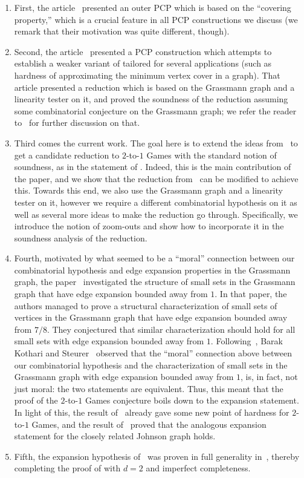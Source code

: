\documentclass{toc}
\begin{document}
\begin{enumerate}
\item First, the %
article~\cite{KS}  %
presented an outer PCP which is based on the ``covering property,'' which is a crucial feature in all PCP constructions we discuss (we remark that their motivation was quite different, though).
\item Second, the %
article~\cite{KMS}
presented a PCP
construction which attempts to establish a weaker variant of  tailored for several applications
(such as hardness of approximating the minimum vertex cover in a graph). That
%
article  %
presented a reduction which is based on the
Grassmann graph and a linearity tester on it, and proved the soundness of the reduction assuming some combinatorial conjecture on the Grassmann graph; we refer the reader to~\cite{KMS} for further discussion on that.
  \item Third comes the current work. The goal here is to extend the ideas from~\cite{KMS} to get a candidate reduction to $2$-to-$1$ Games
  with the standard notion of soundness, as in the statement of . Indeed, this is the main contribution of the
  paper, and we show that the reduction from~\cite{KMS} can be modified to achieve this. Towards this end, we also use the Grassmann graph
  and a linearity tester on it, however we require a different combinatorial hypothesis on it as well as several more ideas to make the
  reduction go through. Specifically, we introduce the notion of zoom-outs and show how to incorporate it in the soundness analysis of
  the reduction.
  \item Fourth, motivated by what seemed to be a ``moral'' connection between our combinatorial hypothesis and edge expansion properties in
  the Grassmann graph, the %
paper~\cite{DKKMS1}
investigated the structure of small sets in the Grassmann graph that have edge expansion
bounded away from $1$. In that %
paper, %
the authors managed to prove a structural characterization of small sets of vertices in the
  Grassmann graph that have edge expansion %
bounded away from $7/8$. They conjectured that similar characterization should hold for all
  small sets with edge expansion bounded away from $1$. Following~\cite{DKKMS1}, Barak Kothari and Steurer~\cite{BKS} observed that the ``moral''
  connection above between our combinatorial hypothesis and the characterization of small sets in the Grassmann
graph  %
  with edge expansion bounded
  away from $1$, is, in fact, not just moral: the two statements are equivalent.
  Thus, this meant that the proof of the $2$-to-$1$ Games conjecture boils down to the expansion
  statement. In light of this, the result of~\cite{DKKMS1} already gave some new point of hardness for $2$-to-$1$ Games, and the result of~\cite{KMMS} proved that the analogous expansion statement for the closely related Johnson graph holds.
  \item Fifth, the expansion hypothesis of~\cite{DKKMS1} was proven in full generality in~\cite{KMS2}, thereby completing the
  proof of  with $d=2$ and imperfect completeness.
\end{enumerate}
\end{document}

